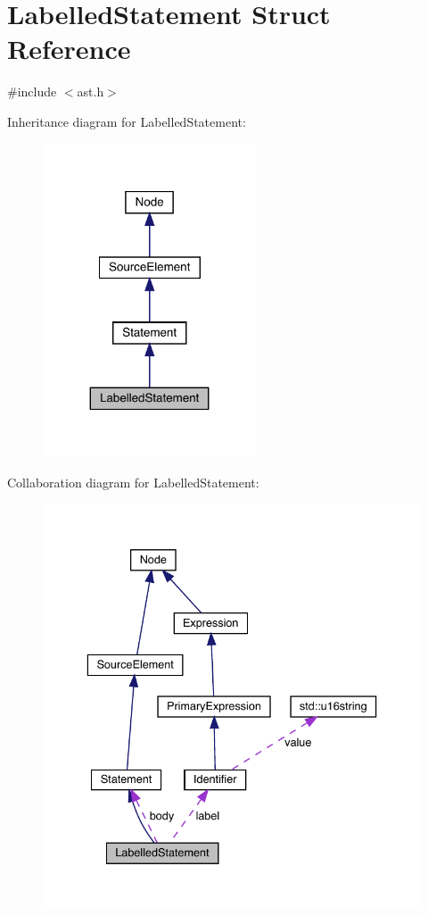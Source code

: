 \hypertarget{struct_labelled_statement}{}\section{Labelled\+Statement Struct Reference}
\label{struct_labelled_statement}


{\ttfamily \#include $<$ast.\+h$>$}



Inheritance diagram for Labelled\+Statement\+:\nopagebreak
\begin{figure}[H]
\begin{center}
\leavevmode
\includegraphics[width=179pt]{struct_labelled_statement__inherit__graph}
\end{center}
\end{figure}


Collaboration diagram for Labelled\+Statement\+:\nopagebreak
\begin{figure}[H]
\begin{center}
\leavevmode
\includegraphics[width=336pt]{struct_labelled_statement__coll__graph}
\end{center}
\end{figure}
